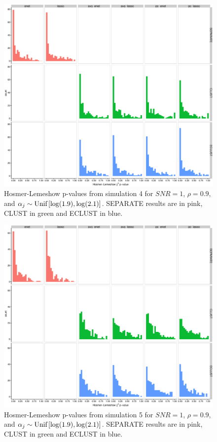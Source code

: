 \begin{figure}[H]
	\centering
	\includegraphics[width=1\linewidth]{./figs/guillimin/results/figures/sim4-5-6-combined/calibration-pvalue_sim4.eps}
	\caption{Hosmer-Lemeshow p-values from simulation 4 for $SNR=1$, $\rho = 0.9$, and \mbox{$\alpha_{j} \sim \textrm{{Unif}}\left[\log(1.9), \log(2.1)\right]$}. SEPARATE results are in pink, CLUST in green and ECLUST in blue.}
	\label{fig:sim-calibrationhist4}
\end{figure}


\begin{figure}[H]
	\centering\includegraphics[width=1\linewidth]{./figs/guillimin/results/figures/sim4-5-6-combined/calibration-pvalue_sim5.eps}
	\caption{Hosmer-Lemeshow p-values from simulation 5 for $SNR=1$, $\rho = 0.9$, and \mbox{$\alpha_{j} \sim \textrm{{Unif}}\left[\log(1.9), \log(2.1)\right]$}. SEPARATE results are in pink, CLUST in green and ECLUST in blue.}\label{fig:sim-calibrationhist5}
\end{figure}

